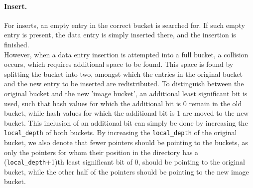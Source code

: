\documentclass[11pt]{article} %
\begin{document}
\paragraph{Insert.} For inserts, an empty entry in the correct bucket is searched for. If such empty entry is present, the data entry is simply inserted there, and the insertion is finished. \\

However, when a data entry insertion is attempted into a full bucket, a collision occurs, which requires additional space to be found. This space is found by splitting the bucket into two, amongst which the entries in the original bucket and the new entry to be inserted are redistributed. To distinguish between the original bucket and the new 'image bucket', an additional least significant bit is used, such that hash values for which the additional bit is 0 remain in the old bucket, while hash values for which the additional bit is 1 are moved to the new bucket. This inclusion of an additional bit can simply be done by increasing the \verb|local_depth| of both buckets. By increasing the \verb|local_depth| of the original bucket, we also denote that fewer pointers should be pointing to the buckets, as only the pointers for whom their position in the directory has a (\verb|local_depth|+1)th least significant bit of 0, should be pointing to the original bucket, while the other half of the pointers should be pointing to the new image bucket.\\
\end{document}
